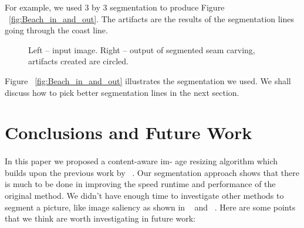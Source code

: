 \documentclass[conference]{acmsiggraph}
\begin{document}
For example, we used 3 by 3 segmentation to produce Figure ~\ref{fig:Beach_in_and_out}. The artifacts are the results of the segmentation lines going through the coast line.


\begin{figure}[ht]       
    \caption{Left -- input image. Right -- output of segmented seam carving, artifacts created are circled.}
    \label{fig:Beach_lines}
\end{figure}

Figure ~\ref{fig:Beach_in_and_out} illustrates the segmentation we used. We shall discuss how to pick better segmentation lines in the next section.


\section{Conclusions and Future Work}

\paragraph{}
In this paper we proposed a content-aware im-
age resizing algorithm which builds upon the previous work by ~\cite{Avidan2007}. Our segmentation approach shows that there is much to be done in improving the speed runtime and performance of the original method. We didn't have enough time to investigate other methods to segment a picture, like image saliency as shown in ~\cite{Liu2007} and ~\cite{Hasan2009}. Here are some points that we think are worth investigating in future work:
\end{document}
